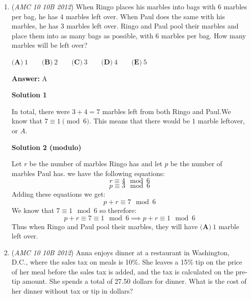 \begin{enumerate}
 $\textbf{(A)}\ (998,2012)\qquad\textbf{(B)}\ (1000,1988)\qquad\textbf{(C)}\ (1000,2024)\qquad\textbf{(D)}\ (1000,4012)\qquad\textbf{(E)}\ (1012,2012)$

 \textbf{Answer: }B



\textbf{Solution}

The line $y = 2000$ is a horizontal line located $12$ units beneath the point $(1000, 2012)$. When a point is reflected about a horizontal line, only the $y$ - coordinate will change. The $x$ - coordinate remains the same. Since the $y$-coordinate of the point is $12$ units above the line of reflection, the new $y$ - coordinate  will be $2000 - 12 = 1988$. Thus, the coordinates of the reflected point are $(1000, 1988)$. $\boxed{\textbf{(B)}}$



	\item (\textit{AMC 10 10B 2012}) When Ringo places his marbles into bags with 6 marbles per bag, he has 4 marbles left over.  When Paul does the same with his marbles, he has 3 marbles left over.  Ringo and Paul pool their marbles and place them into as many bags as possible, with 6 marbles per bag.  How many marbles will be left over?


 $\textbf{(A)}\ 1\qquad\textbf{(B)}\ 2\qquad\textbf{(C)}\ 3\qquad\textbf{(D)}\ 4\qquad\textbf{(E)}\ 5$

 \textbf{Answer: }A



\textbf{Solution 1}

In total, there were $3+4=7$ marbles left from both Ringo and Paul.We know that  $7 \equiv 1 \pmod{6}$. This means that there would be $1$ marble leftover, or $\boxed{A}$.

 



\textbf{Solution 2 (modulo)}

Let $r$ be the number of marbles Ringo has and let $p$ be the number of marbles Paul has. we have the following equations:
 \[r \equiv 4 \mod{6}\] 
 \[p \equiv 3 \mod{6}\]Adding these equations we get:
 \[p + r \equiv 7 \mod{6}\]We know that $7 \equiv 1 \mod{6}$ so therefore:
 \[p + r \equiv 7 \equiv 1 \mod{6} \implies p + r \equiv 1 \mod{6}\]Thus when Ringo and Paul pool their marbles, they will have $\boxed{\textbf{(A)}\ 1}$ marble left over.

 


	\item (\textit{AMC 10 10B 2012}) Anna enjoys dinner at a restaurant in Washington, D.C., where the sales tax on meals is 10\%. She leaves a 15\% tip on the price of her meal before the sales tax is added, and the tax is calculated on the pre-tip amount. She spends a total of 27.50 dollars for dinner. What is the cost of her dinner without tax or tip in dollars?



\end{enumerate}

